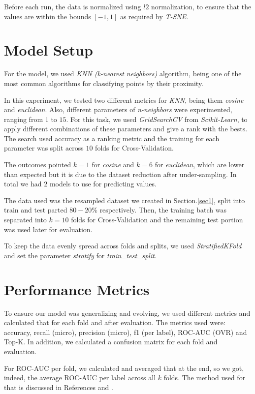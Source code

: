 \documentclass{article}
\begin{document}
Before each run, the data is normalized using $l2$ normalization, to ensure that the values are within the bounds $[-1,1]$ as required by \textit{T-SNE}.

\section{Model Setup} \label{sec2}

For the model, we used \textit{KNN (k-nearest neighbors)} algorithm, being one of the most common algorithms for classifying points by their proximity.

In this experiment, we tested two different metrics for \textit{KNN}, being them \textit{cosine} and \textit{euclidean}. Also, different parameters of \textit{n-neighbors} were experimented, ranging from $1$ to $15$. For this task, we used \textit{GridSearchCV} from \textit{Scikit-Learn}, to apply different combinations of these parameters and give a rank with the bests. The search used accuracy as a ranking metric and the training for each parameter was split across $10$ folds for Cross-Validation.

The outcomes pointed $k=1$ for \textit{cosine} and $k=6$ for \textit{euclidean}, which are lower than expected but it is due to the dataset reduction after under-sampling. In total we had $2$ models to use for predicting values.

The data used was the resampled dataset we created in Section.\ref{sec1}, split into train and test parted $80-20\%$ respectively. Then, the training batch was separated into $k=10$ folds for Cross-Validation and the remaining test portion was used later for evaluation.

To keep the data evenly spread across folds and splits, we used \textit{StratifiedKFold} and set the parameter \textit{stratify} for \textit{train\_test\_split}.

\section{Performance Metrics} \label{sec3}

To ensure our model was generalizing and evolving, we used different metrics and calculated that for each fold and after evaluation. The metrics used were: accuracy, recall (micro), precision (micro), f1 (per label), ROC-AUC (OVR) and Top-K. In addition, we calculated a confusion matrix for each fold and evaluation.

For ROC-AUC per fold, we calculated and averaged that at the end, so we got, indeed, the average ROC-AUC per label across all $k$ folds. The method used for that is discussed in References \cite{_receiver} and \cite{shen_2017_how}.
\end{document}
